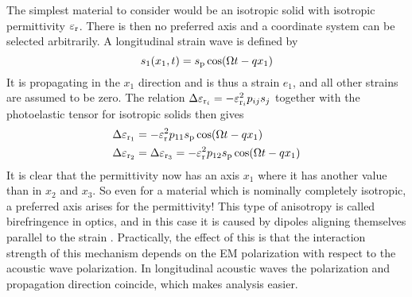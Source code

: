 \documentclass[11pt,twoside]{eitExjobb}
\begin{document}
	The simplest material to consider would be an isotropic solid with isotropic permittivity $\varepsilon_{\mathrm{r}}$. There is then no preferred axis and a coordinate system can be selected arbitrarily. A longitudinal strain wave is defined by \begin{equation*}
		s_1(x_1,t) = s_{\mathrm{p}} \cos(\Omega t - qx_1)
	\end{equation*}
	It is propagating in the $x_1$ direction and is thus a strain $e_1$, and all other strains are assumed to be zero. The relation $\Delta \varepsilon_{\mathrm{r}_i} = -\varepsilon_{\mathrm{r}_i}^2 p_{ij} s_j$ together with the photoelastic tensor for isotropic solids then gives
	\begin{align*}
		\Delta \varepsilon_{\mathrm{r}_1} &= -\varepsilon_{\mathrm{r}}^2 p_{11} s_{\mathrm{p}} \cos(\Omega t - qx_1)\\
		\Delta \varepsilon_{\mathrm{r}_2} &= \Delta \varepsilon_{\mathrm{r}_3} = -\varepsilon_{\mathrm{r}}^2 p_{12} s_{\mathrm{p}} \cos(\Omega t - qx_1)
	\end{align*}
	It is clear that the permittivity now has an axis $x_1$ where it has another value than in $x_2$ and $x_3$. So even for a material which is nominally completely isotropic, a preferred axis arises for the permittivity! This type of anisotropy is called birefringence in optics, and in this case it is caused by dipoles aligning themselves parallel to the strain \cite{Korpel1988}. Practically, the effect of this is that the interaction strength of this mechanism depends on the EM polarization with respect to the acoustic wave polarization. In longitudinal acoustic waves the polarization and propagation direction coincide, which makes analysis easier.
	
\end{document}
